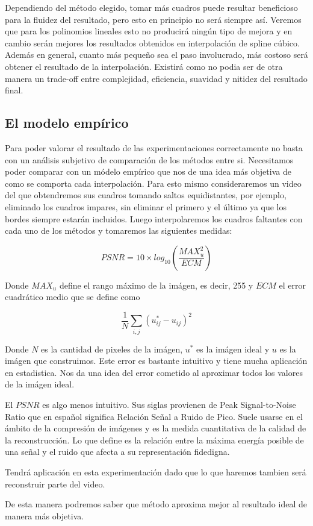 Dependiendo del método elegido, tomar más cuadros puede resultar beneficioso para la fluidez del resultado, pero esto en principio no será siempre así. Veremos que para los polinomios lineales esto no producirá ningún tipo de mejora y en cambio serán mejores los resultados obtenidos en interpolación de spline cúbico. Además en general, cuanto más pequeño sea el paso involucrado, más costoso será obtener el resultado de la interpolación. Existirá como no podia ser de otra manera un trade-off entre complejidad, eficiencia, suavidad y nitidez del resultado final. 
 
\subsection{El modelo empírico}

Para poder valorar el resultado de las experimentaciones correctamente no basta con un análisis subjetivo de comparación de los métodos entre si. Necesitamos poder comparar con un módelo empírico que nos de una idea más objetiva de como se comporta cada interpolación. Para esto mismo consideraremos un video del que obtendremos sus cuadros tomando saltos equidistantes, por ejemplo, eliminado los cuadros impares, sin eliminar el primero y el último ya que los bordes siempre estarán incluidos. Luego interpolaremos los cuadros faltantes con cada uno de los métodos y tomaremos las siguientes medidas:

\begin{equation}
	PSNR = 10 \times log_{10}(\dfrac{MAX_u^2}{ECM})
\end{equation}

Donde $MAX_u$ define el rango máximo de la imágen, es decir, 255 y $ECM$ el error cuadrático medio que se define como

\begin{equation}
	\dfrac{1}{N}\sum_{i,j}(u_{ij}^* - u_{ij})^2
\end{equation}

Donde $N$ es la cantidad de pixeles de la imágen, $u^*$ es la imágen ideal y $u$ es la imágen que construimos. Este error es bastante intuitivo y tiene mucha aplicación en estadistica. Nos da una idea del error cometido al aproximar todos los valores de la imágen ideal. 

El $PSNR$ es algo menos intuitivo. Sus siglas provienen de Peak Signal-to-Noise Ratio que en español significa Relación Señal a Ruido de Pico. Suele usarse en el ámbito de la compresión de imágenes y es la medida cuantitativa de la calidad de la reconstrucción. Lo que define es la relación entre la máxima energía posible de una señal y el ruido que afecta a su representación fidedigna. 

Tendrá aplicación en esta experimentación dado que lo que haremos tambien será reconstruir parte del video.

De esta manera podremos saber que método aproxima mejor al resultado ideal de manera más objetiva. 











